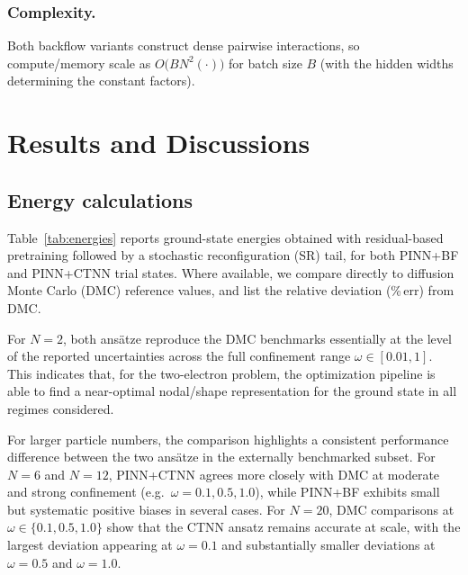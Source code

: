 \documentclass[superscriptaddress,unsortedaddress,amsmath,amssymb,aps]{revtex4-2}
\begin{document}
\subsubsection{Complexity.}
Both backflow variants construct dense pairwise interactions, so compute/memory scale as
$O\!\big(BN^2(\cdot)\big)$ for batch size $B$ (with the hidden widths determining the constant factors).

\section{Results and Discussions}

\subsection{Energy calculations}
\label{subsec:energy}

Table~\ref{tab:energies} reports ground-state energies obtained with residual-based pretraining followed by a
stochastic reconfiguration (SR) tail, for both PINN+BF and PINN+CTNN trial states.
Where available, we compare directly to diffusion Monte Carlo (DMC) reference values, and list the relative
deviation (\%\,err) from DMC.

For $N=2$, both ans\"atze reproduce the DMC benchmarks essentially at the level of the reported uncertainties
across the full confinement range $\omega\in[0.01,1]$. This indicates that, for the two-electron problem,
the optimization pipeline is able to find a near-optimal nodal/shape representation for the ground state in
all regimes considered.

For larger particle numbers, the comparison highlights a consistent performance difference between the two
ans\"atze in the externally benchmarked subset. For $N=6$ and $N=12$, PINN+CTNN agrees more closely with DMC
at moderate and strong confinement (e.g.\ $\omega=0.1,0.5,1.0$), while PINN+BF exhibits small but systematic
positive biases in several cases. For $N=20$, DMC comparisons at $\omega\in\{0.1,0.5,1.0\}$ show that the CTNN
ansatz remains accurate at scale, with the largest deviation appearing at $\omega=0.1$ and substantially smaller
deviations at $\omega=0.5$ and $\omega=1.0$.
\end{document}
